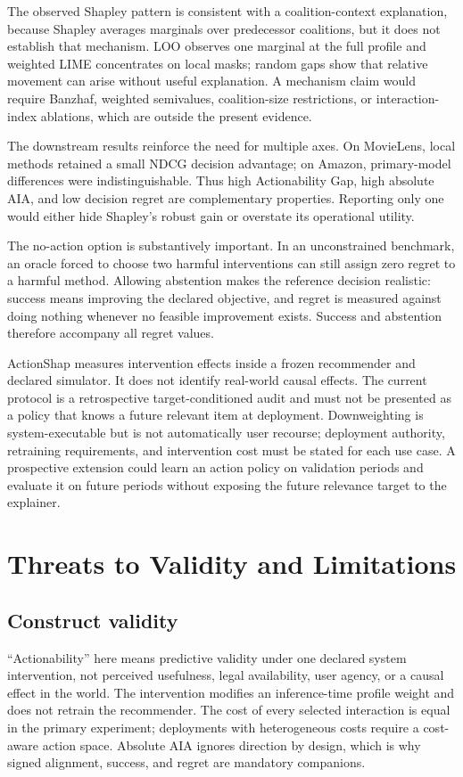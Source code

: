 \documentclass[pdflatex,sn-basic]{sn-jnl}
\begin{document}
The observed Shapley pattern is consistent with a coalition-context explanation, because Shapley averages marginals over predecessor coalitions, but it does not establish that mechanism. LOO observes one marginal at the full profile and weighted LIME concentrates on local masks; random gaps show that relative movement can arise without useful explanation. A mechanism claim would require Banzhaf, weighted semivalues, coalition-size restrictions, or interaction-index ablations, which are outside the present evidence.

The downstream results reinforce the need for multiple axes. On MovieLens, local methods retained a small NDCG decision advantage; on Amazon, primary-model differences were indistinguishable. Thus high Actionability Gap, high absolute AIA, and low decision regret are complementary properties. Reporting only one would either hide Shapley's robust gain or overstate its operational utility.

The no-action option is substantively important. In an unconstrained benchmark, an oracle forced to choose two harmful interventions can still assign zero regret to a harmful method. Allowing abstention makes the reference decision realistic: success means improving the declared objective, and regret is measured against doing nothing whenever no feasible improvement exists. Success and abstention therefore accompany all regret values.

ActionShap measures intervention effects inside a frozen recommender and declared simulator. It does not identify real-world causal effects. The current protocol is a retrospective target-conditioned audit and must not be presented as a policy that knows a future relevant item at deployment. Downweighting is system-executable but is not automatically user recourse; deployment authority, retraining requirements, and intervention cost must be stated for each use case. A prospective extension could learn an action policy on validation periods and evaluate it on future periods without exposing the future relevance target to the explainer.

\section{Threats to Validity and Limitations}
\subsection{Construct validity}
``Actionability'' here means predictive validity under one declared system intervention, not perceived usefulness, legal availability, user agency, or a causal effect in the world. The intervention modifies an inference-time profile weight and does not retrain the recommender. The cost of every selected interaction is equal in the primary experiment; deployments with heterogeneous costs require a cost-aware action space. Absolute AIA ignores direction by design, which is why signed alignment, success, and regret are mandatory companions.
\end{document}
